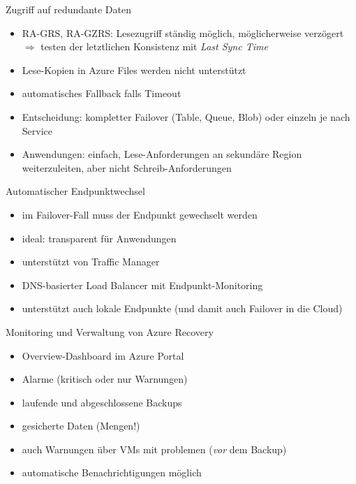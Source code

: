 \begin{flashcard}[Definition]{Zugriff auf redundante Daten}
  \begin{itemize}
    \item RA-GRS, RA-GZRS: Lesezugriff ständig möglich, möglicherweise verzögert\newline
    $\Rightarrow$ testen der letztlichen Konsistenz mit \emph{Last Sync Time}
    \item Lese-Kopien in Azure Files werden nicht unterstützt
    \item automatisches Fallback falls Timeout
    \item Entscheidung: kompletter Failover (Table, Queue, Blob) oder einzeln je nach Service
    \item Anwendungen: einfach, Lese-Anforderungen an sekundäre Region weiterzuleiten, aber nicht Schreib-Anforderungen
  \end{itemize}
\end{flashcard}

\begin{flashcard}[Definition]{Automatischer Endpunktwechsel}
  \begin{itemize}
    \item im Failover-Fall muss der Endpunkt gewechselt werden
    \item ideal: transparent für Anwendungen
    \item unterstützt von Traffic Manager
    \item DNS-basierter Load Balancer mit Endpunkt-Monitoring
    \item unterstützt auch lokale Endpunkte\newline
    (und damit auch Failover in die Cloud)
  \end{itemize}
\end{flashcard}


\begin{flashcard}[Definition]{Monitoring und Verwaltung von Azure Recovery}
  \begin{itemize}
    \item Overview-Dashboard im Azure Portal
    \item Alarme (kritisch oder nur Warnungen)
    \item laufende und abgeschlossene Backups
    \item gesicherte Daten (Mengen!)
    \item auch Warnungen über VMs mit problemen (\emph{vor} dem Backup)
    \item automatische Benachrichtigungen möglich
  \end{itemize}
\end{flashcard}

